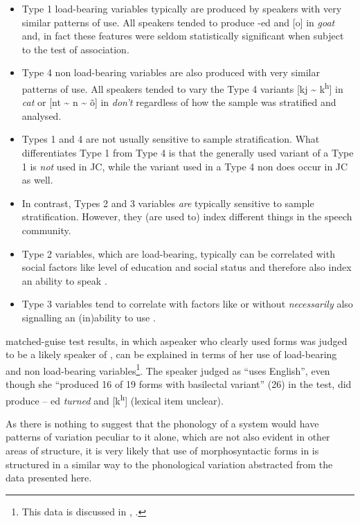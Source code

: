 \begin{itemize}
\item Type 1 load-bearing variables typically are produced by speakers with very similar patterns of use.  All speakers tended to produce -ed and [o] in \textit{goat} and, in fact these features were seldom statistically significant when subject to the test of association.
\item Type 4 non load-bearing variables are also produced with very similar patterns of use.  All speakers tended to vary the Type 4 variants [kj {\textasciitilde} k\textsuperscript{h}] in \textit{cat} or [nt {\textasciitilde} n {\textasciitilde} õ] in \textit{don’t} regardless of how the sample was stratified and analysed.  
\item Types 1 and 4 are not usually sensitive to sample stratification.  What differentiates Type 1 from Type 4 is that the generally used variant of a Type 1  is \textit{not} used in JC, while the variant used in a Type 4 non  does occur in JC as well.
\item In contrast, Types 2 and 3 variables \textit{are} typically sensitive to sample stratification.  However, they (are used to) index different things in the speech community. 
\item Type 2 variables, which are load-bearing, typically can be correlated with social factors like level of education and social status and therefore also index an ability to speak .  
\item  Type 3 variables tend to correlate with factors like  or  without \textit{necessarily} also signalling an (in)ability to use .
\end{itemize}

 matched-guise test results, in which a\linebreak speaker who clearly used  forms was judged to be a likely speaker of , can be explained in terms of her use of load-bearing and non load-bearing variables\footnote{This data is discussed in , .}.  The speaker judged as “uses English”, even though she “produced 16 of 19 forms with basilectal variant” (26) in the test, did produce – ed \textit{turned} and [k\textsuperscript{h}] (lexical item unclear).  

As there is nothing to suggest that the phonology of a system would have patterns of variation peculiar to it alone, which are not also evident in other areas of structure, it is very likely that use of morphosyntactic forms in  is structured in a similar way to the phonological variation abstracted from the data presented here. 

